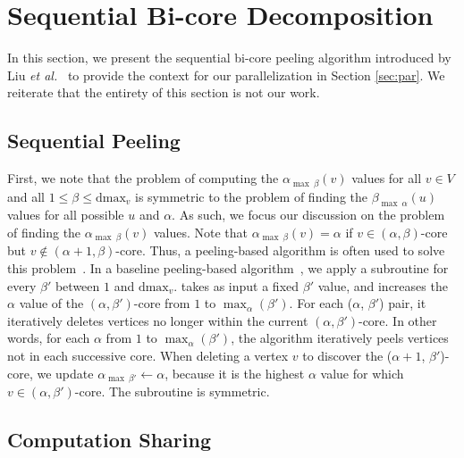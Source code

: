 \section{Sequential Bi-core Decomposition}
In this section, we present the sequential bi-core peeling algorithm introduced by Liu \textit{et al.}~\cite{Liu2020Efficient} to provide the context for our parallelization in Section \ref{sec:par}. We reiterate that the entirety of this section is not our work.

\subsection{Sequential Peeling}

First, we note that the problem of computing the $\alpha_{\max\ \beta}(v)$ values for all $v\in V$ and all $1\le\beta\le \text{dmax}_v$ is symmetric to the problem of finding the $\beta_{\max\ \alpha}(u)$ values for all possible $u$ and $\alpha$. As such, we focus our discussion on the problem of finding the $\alpha_{\max\ \beta}(v)$ values. 
Note that $\alpha_{\max\ \beta}(v)=\alpha$ if $v\in (\alpha,\beta)$-core but $v\not\in (\alpha+1,\beta)$-core. Thus, a peeling-based algorithm is often used to solve this problem~\cite{AhmedBat07,DingLi17}. In a baseline peeling-based algorithm~\cite{Liu2020Efficient}, we apply a subroutine  for every $\beta'$ between $1$ and $\text{dmax}_v$.  takes as input a fixed $\beta'$ value, and increases the $\alpha$ value of the $(\alpha,\beta')$-core from $1$ to $\max_\alpha(\beta')$. For each ($\alpha$, $\beta'$) pair, it iteratively deletes vertices no longer within the current $(\alpha,\beta')$-core. In other words, for each $\alpha$ from $1$ to $\max_\alpha(\beta')$, the algorithm iteratively peels vertices not in each successive core. When deleting a vertex $v$ to discover the ($\alpha+1$, $\beta'$)-core, we update $\alpha_{\max\ \beta'}\leftarrow \alpha$, because it is the highest $\alpha$ value for which $v\in (\alpha,\beta')$-core. The subroutine  is symmetric.

\subsection{Computation Sharing}

